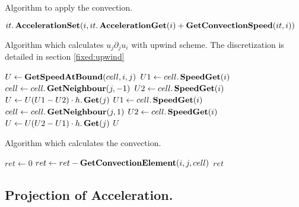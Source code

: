 \begin{algorithm}
\caption{Algorithm to apply the convection.}
\label{code:ApplyConvection}
\begin{algorithmic}[1]
					\State $it.\mathop{\textbf{AccelerationSet}}(i,it.\mathop{\textbf{AccelerationGet}}(i)+\mathop{\textbf{GetConvectionSpeed}}(it,i))$ 
				\EndIf
			\EndFor
		\EndFor
	\EndFunction
		\end{algorithmic}
\end{algorithm}

\begin{algorithm}
\caption{Algorithm which calculates $u_{j}\partial_{j}u_{i}$ with upwind scheme. The discretization is detailed in section \ref{fixed:upwind}}
\label{code:GetConvectionElement}
\begin{algorithmic}[1]
		\State $U \gets \mathop{\textbf{GetSpeedAtBound}}(cell,i,j)$
			\State $U1\gets cell.\mathop{\textbf{SpeedGet}}(i)$
			\State $cell \gets cell.\mathop{\textbf{GetNeighbour}}(j,-1)$
			\State $U2 \gets cell.\mathop{\textbf{SpeedGet}}(i)$
			\State $U \gets U(U1-U2)\cdot h.\mathop{\textbf{Get}}(j)$
		\Else
			\State $U1 \gets cell.\mathop{\textbf{SpeedGet}}(i)$
			\State $cell \gets cell.\mathop{\textbf{GetNeighbour}}(j,1)$
			\State $U2\gets cell.\mathop{\textbf{SpeedGet}}(i)$
			\State $U\gets U(U2-U1)\cdot h.\mathop{\textbf{Get}}(j)$
		\EndIf
		\State \Return $U$
\EndFunction
			\end{algorithmic}
\end{algorithm}

\begin{algorithm}
\caption{Algorithm which calculates the convection.}
\label{code:GetConvectionSpeed}
\begin{algorithmic}[1]
		\State  $ret \gets 0$
			\State $ret\gets ret-\mathop{\textbf{GetConvectionElement}}(i,j,cell)$
		\EndFor
		\State \Return $ret$
	\EndFunction
 \end{algorithmic}
\end{algorithm}


\subsection{Projection of Acceleration.}

